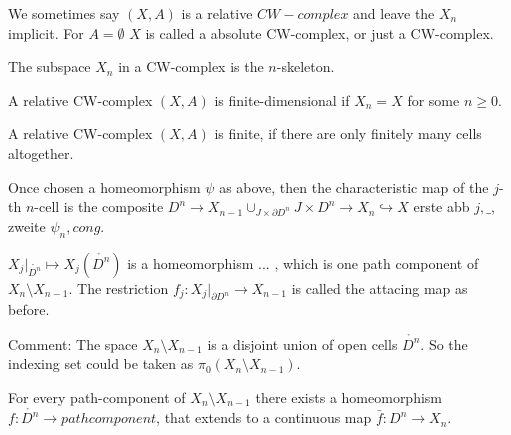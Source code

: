 \documentclass{TemplateLecture}
\begin{document}
\begin{notation}
    We sometimes say \((X,A)\) is a relative \(CW-complex\) and leave the \(X_n\) implicit.
    For \(A = \emptyset\) \(X\) is called a absolute CW-complex, or just a CW-complex.

    The subspace \(X_n\) in a CW-complex is the \(n\)-skeleton.

    A relative CW-complex \((X,A)\) is finite-dimensional if \(X_n = X\) for some \(n \geq 0\).

    A relative CW-complex \((X,A)\) is finite, if there are only finitely many cells altogether.

    Once chosen a homeomorphism \(\psi\) as above, then the characteristic map  of the \(j\)-th \(n\)-cell is the composite \(D^n \to X_{n-1}\cup_{J\times \partial D^n} J \times D^n \to X_n \hookrightarrow X\) erste abb \(j, \_\), zweite \(\psi_n, cong\).

    \(X_j\rvert_{\mathring{D^n}} \mapsto X_j(\mathring{D^n})\) is a homeomorphism  ... , which is one path component of \(X_n \setminus X_{n-1}\). The restriction \(f_j \colon X_j\rvert_{\partial D^n} \to X_{n-1}\) is called the attacing map as before.
\end{notation}

Comment: The space \(X_n \setminus X_{n-1}\) is a disjoint union of open cells \(\mathring{D^n}\). So the indexing set could be taken as \(\pi_0(X_n\setminus X_{n-1})\).

For every path-component of \(X_n \setminus X_{n-1}\) there exists a homeomorphism \(f \colon \mathring{D^n} \to pathcomponent\), that extends to a continuous map \(\bar f \colon D^n \to X_n\).
\end{document}

